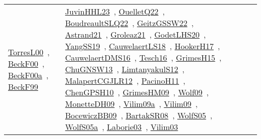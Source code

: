 {\begin{longtable}{lp{3cm}>{\raggedright\arraybackslash}p{6cm}>{\raggedright\arraybackslash}p{6cm}>{\raggedright\arraybackslash}p{8cm}}
\href{../works/TorresL00.pdf}{TorresL00}~\cite{TorresL00}, \href{../works/BeckF00.pdf}{BeckF00}~\cite{BeckF00}, \href{../works/BeckF00a.pdf}{BeckF00a}~\cite{BeckF00a}, \href{../works/BeckF99.pdf}{BeckF99}~\cite{BeckF99} & \href{../works/JuvinHHL23.pdf}{JuvinHHL23}~\cite{JuvinHHL23}, \href{../works/OuelletQ22.pdf}{OuelletQ22}~\cite{OuelletQ22}, \href{../works/BoudreaultSLQ22.pdf}{BoudreaultSLQ22}~\cite{BoudreaultSLQ22}, \href{../works/GeitzGSSW22.pdf}{GeitzGSSW22}~\cite{GeitzGSSW22}, \href{../works/Astrand21.pdf}{Astrand21}~\cite{Astrand21}, \href{../works/Groleaz21.pdf}{Groleaz21}~\cite{Groleaz21}, \href{../works/GodetLHS20.pdf}{GodetLHS20}~\cite{GodetLHS20}, \href{../works/YangSS19.pdf}{YangSS19}~\cite{YangSS19}, \href{../works/CauwelaertLS18.pdf}{CauwelaertLS18}~\cite{CauwelaertLS18}, \href{../works/HookerH17.pdf}{HookerH17}~\cite{HookerH17}, \href{../works/CauwelaertDMS16.pdf}{CauwelaertDMS16}~\cite{CauwelaertDMS16}, \href{../works/Tesch16.pdf}{Tesch16}~\cite{Tesch16}, \href{../works/GrimesH15.pdf}{GrimesH15}~\cite{GrimesH15}, \href{../works/ChuGNSW13.pdf}{ChuGNSW13}~\cite{ChuGNSW13}, \href{../works/LimtanyakulS12.pdf}{LimtanyakulS12}~\cite{LimtanyakulS12}, \href{../works/MalapertCGJLR12.pdf}{MalapertCGJLR12}~\cite{MalapertCGJLR12}, \href{../works/PacinoH11.pdf}{PacinoH11}~\cite{PacinoH11}, \href{../works/ChenGPSH10.pdf}{ChenGPSH10}~\cite{ChenGPSH10}, \href{../works/GrimesHM09.pdf}{GrimesHM09}~\cite{GrimesHM09}, \href{../works/Wolf09.pdf}{Wolf09}~\cite{Wolf09}, \href{../works/MonetteDH09.pdf}{MonetteDH09}~\cite{MonetteDH09}, \href{../works/Vilim09a.pdf}{Vilim09a}~\cite{Vilim09a}, \href{../works/Vilim09.pdf}{Vilim09}~\cite{Vilim09}, \href{../works/BocewiczBB09.pdf}{BocewiczBB09}~\cite{BocewiczBB09}, \href{../works/BartakSR08.pdf}{BartakSR08}~\cite{BartakSR08}, \href{../works/WolfS05.pdf}{WolfS05}~\cite{WolfS05}, \href{../works/WolfS05a.pdf}{WolfS05a}~\cite{WolfS05a}, \href{../works/Laborie03.pdf}{Laborie03}~\cite{Laborie03}, \href{../works/Vilim03.pdf}{Vilim03}~\cite{Vilim03}\\

\end{longtable}}
